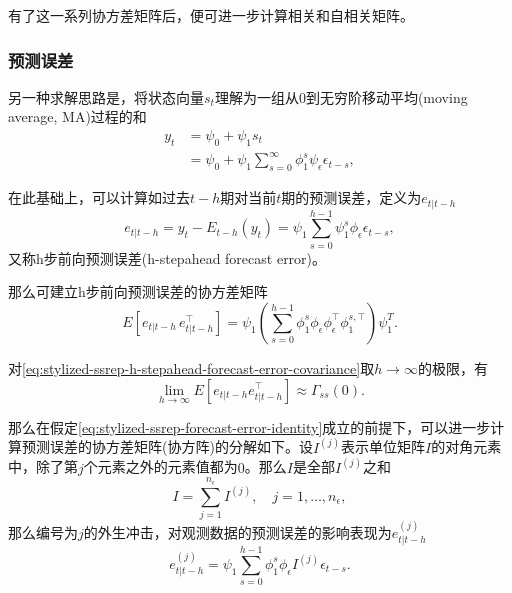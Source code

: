 有了这一系列协方差矩阵后，便可进一步计算相关和自相关矩阵。

\subsubsection{预测误差}
\label{sec:stylized-ssrep-covariance-forecast}
另一种求解思路是，将状态向量$s_{t}$理解为一组从$0$到无穷阶移动平均(moving average, MA)过程的和
\begin{equation}
  \label{eq:stylized-ssrep-ma}
\begin{split}
  y_{t} & = \psi_{0} + \psi_{1} s_{t} \\
  & = \psi_{0} + \psi_{1} \sum_{s=0}^{\infty} \phi_{1}^{s} \psi_{\epsilon} \epsilon_{t-s},
\end{split}
\end{equation}

在此基础上，可以计算如过去$t-h$期对当前$t$期的预测误差，定义为$e_{t | t-h}$
\begin{equation}
  \label{eq:stylized-ssrep-h-stepahead-forecast-error}
  e_{t | t-h} = y_{t} - E_{t-h} \left( y_{t} \right)
  = \psi_{1} \sum_{s=0}^{h-1} \psi_{1}^{s} \phi_{\epsilon} \epsilon_{t-s},
\end{equation}
又称h步前向预测误差(h-stepahead forecast error)。

那么可建立h步前向预测误差的协方差矩阵
\begin{equation}
  \label{eq:stylized-ssrep-h-stepahead-forecast-error-covariance}
  E \left[ e_{t | t-h} \, e_{t | t-h}^{\top} \right]
  = \psi_{1}
  \left(
  \sum_{s=0}^{h-1} \phi_{1}^{s} \phi_{\epsilon} \phi_{\epsilon}^{\top} \phi_{1}^{s, \top}
  \right) \psi_{1}^{T}.
\end{equation}

对\eqref{eq:stylized-ssrep-h-stepahead-forecast-error-covariance}取$h \rightarrow \infty$的极限，有
\begin{equation}
  \label{eq:stylized-ssrep-h-stepahead-forecast-error-covariance-infty}
  \lim_{h \rightarrow \infty} E \left[ e_{t | t-h} e_{t | t-h}^{\top} \right]
  \approx \Gamma_{ss} \left( 0 \right).
\end{equation}

那么在假定\eqref{eq:stylized-ssrep-forecast-error-identity}成立的前提下，可以进一步计算预测误差的协方差矩阵(协方阵)的分解如下。设$I^{(j)}$表示单位矩阵$I$的对角元素中，除了第$j$个元素之外的元素值都为$0$。那么$I$是全部$I^{(j)}$之和
\begin{equation}
  \label{eq:stylized-ssrep-forecast-cov-identity}
  I = \sum_{j=1}^{n_{\epsilon}} I^{(j)}, \quad j=1,\ldots,n_{\epsilon},
\end{equation}
那么编号为$j$的外生冲击，对观测数据的预测误差的影响表现为$e^{(j)}_{t|t-h}$
\begin{equation}
  \label{eq:stylized-ssrep-forecast-error-j}
  e^{(j)}_{t|t-h} = \psi_{1} \sum_{s=0}^{h-1} \phi_{1}^{s} \phi_{\epsilon} I^{(j)} \epsilon_{t-s}.
\end{equation}

